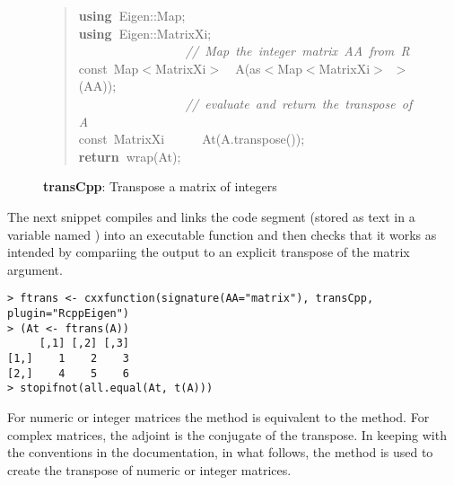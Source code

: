 \documentclass[shortnames,article]{jss}
\newcommand{\hlstd}[1]{\textcolor[rgb]{0,0,0}{#1}}
\newcommand{\hlslc}[1]{\textcolor[rgb]{0.67,0.13,0.13}{\it{#1}}}
\newcommand{\hlsym}[1]{\textcolor[rgb]{0,0,0}{#1}}
\newcommand{\hlkwa}[1]{\textcolor[rgb]{0.61,0.13,0.93}{\bf{#1}}}
\newcommand{\hlkwb}[1]{\textcolor[rgb]{0.13,0.54,0.13}{#1}}
\newcommand{\hlkwd}[1]{\textcolor[rgb]{0,0,0}{#1}}
\begin{document}
\begin{figure}[htb]
  \begin{quote}
    \noindent
    \ttfamily
    \hlstd{}\hlkwa{using\ }\hlstd{Eigen}\hlsym{::}\hlstd{Map}\hlsym{;}\hspace*{\fill}\\
    \hlstd{}\hlkwa{using\ }\hlstd{Eigen}\hlsym{::}\hlstd{MatrixXi}\hlsym{;}\hspace*{\fill}\\
    \hlstd{}\hlstd{\ \ \ \ \ \ \ \ \ \ \ \ \ \ \ \ \ }\hlstd{}\hlslc{//\ Map\ the\ integer\ matrix\ AA\ from\ R}\hspace*{\fill}\\
    \hlstd{}\hlkwb{const\ }\hlstd{Map}\hlsym{$<$}\hlstd{MatrixXi}\hlsym{$>$}\hlstd{\ \ }\hlsym{}\hlstd{}\hlkwd{A}\hlstd{}\hlsym{(}\hlstd{as}\hlsym{$<$}\hlstd{Map}\hlsym{$<$}\hlstd{MatrixXi}\hlsym{$>$\ $>$(}\hlstd{AA}\hlsym{));}\hspace*{\fill}\\
    \hlstd{}\hlstd{\ \ \ \ \ \ \ \ \ \ \ \ \ \ \ \ \ }\hlstd{}\hlslc{//\ evaluate\ and\ return\ the\ transpose\ of\ A}\hspace*{\fill}\\
    \hlstd{}\hlkwb{const\ }\hlstd{MatrixXi}\hlstd{\ \ \ \ \ \ }\hlstd{}\hlkwd{At}\hlstd{}\hlsym{(}\hlstd{A}\hlsym{.}\hlstd{}\hlkwd{transpose}\hlstd{}\hlsym{());}\hspace*{\fill}\\
    \hlstd{}\hlkwa{return\ }\hlstd{}\hlkwd{wrap}\hlstd{}\hlsym{(}\hlstd{At}\hlsym{);}\hlstd{}\hspace*{\fill}
    \normalfont
  \end{quote}
  \caption{\textbf{transCpp}: Transpose a matrix of integers}
  \label{trans}
\end{figure}

The next  snippet compiles and links the  code
segment (stored as text in a variable named ) into an
executable function  and then checks that it works as intended
by compariing the output to an explicit transpose of the matrix argument.
\begin{verbatim}
> ftrans <- cxxfunction(signature(AA="matrix"), transCpp, plugin="RcppEigen")
> (At <- ftrans(A))
     [,1] [,2] [,3]
[1,]    1    2    3
[2,]    4    5    6
> stopifnot(all.equal(At, t(A)))
\end{verbatim}


For numeric or integer matrices the  method is
equivalent to the  method.  For complex matrices, the
adjoint is the conjugate of the transpose.  In keeping with the
conventions in the  documentation, in what follows,
the  method is used to create the transpose of numeric or
integer matrices.





\end{document}
